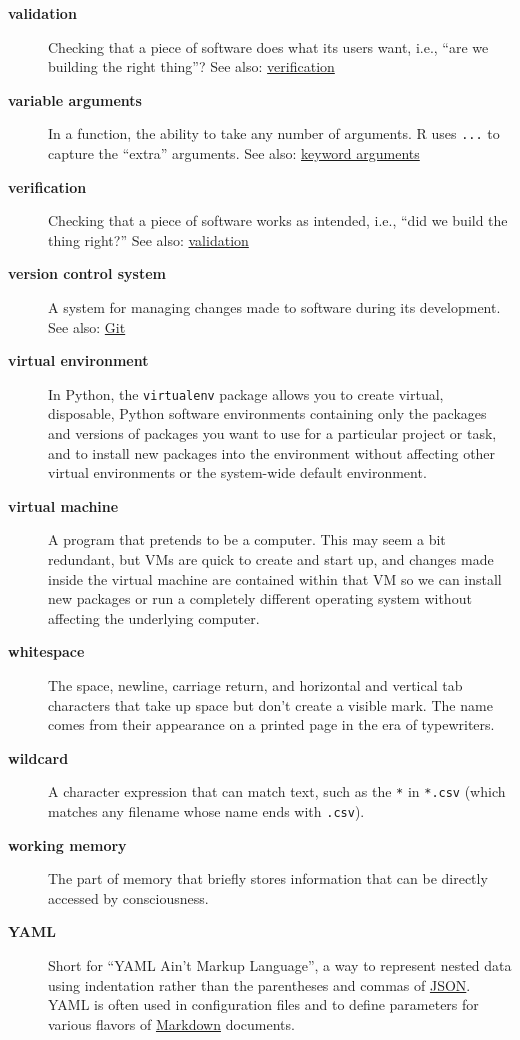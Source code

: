 \documentclass[
]{krantz}
\begin{document}
\begin{description}
\item[\textbf{validation}]
Checking that a piece of software does what its users want, i.e., ``are we building the right thing''? See also: \protect\hyperlink{verification}{verification}
\item[\textbf{variable arguments}]
In a function, the ability to take any number of arguments. R uses \texttt{...} to capture the ``extra'' arguments. See also: \protect\hyperlink{keyword_arguments}{keyword arguments}
\item[\textbf{verification}]
Checking that a piece of software works as intended, i.e., ``did we build the thing right?'' See also: \protect\hyperlink{validation}{validation}
\item[\textbf{version control system}]
A system for managing changes made to software during its development. See also: \protect\hyperlink{git}{Git}
\item[\textbf{virtual environment}]
In Python, the \texttt{virtualenv} package allows you to create virtual, disposable, Python software environments containing only the packages and versions of packages you want to use for a particular project or task, and to install new packages into the environment without affecting other virtual environments or the system-wide default environment.
\item[\textbf{virtual machine}]
A program that pretends to be a computer. This may seem a bit redundant, but VMs are quick to create and start up, and changes made inside the virtual machine are contained within that VM so we can install new packages or run a completely different operating system without affecting the underlying computer.
\item[\textbf{whitespace}]
The space, newline, carriage return, and horizontal and vertical tab characters that take up space but don't create a visible mark. The name comes from their appearance on a printed page in the era of typewriters.
\item[\textbf{wildcard}]
A character expression that can match text, such as the \texttt{*} in \texttt{*.csv} (which matches any filename whose name ends with \texttt{.csv}).
\item[\textbf{working memory}]
The part of memory that briefly stores information that can be directly accessed by consciousness.
\item[\textbf{YAML}]
Short for ``YAML Ain't Markup Language'', a way to represent nested data using indentation rather than the parentheses and commas of \protect\hyperlink{json}{JSON}. YAML is often used in configuration files and to define parameters for various flavors of \protect\hyperlink{markdown}{Markdown} documents.
\end{description}
\end{document}
